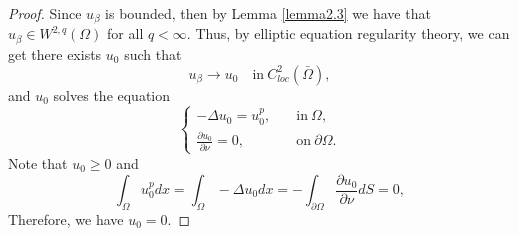 \documentclass[12pt,reqno]{amsart}
\numberwithin{equation}{section}
\theoremstyle{definition}
\begin{document}
\begin{proof}
Since $u_\beta$ is bounded, then by Lemma \ref{lemma2.3} we have that $u_\beta\in W^{2,q}(\Omega)$ for all $q<\infty$. Thus, by elliptic equation regularity theory, we can get there exists $u_0$ such that 
$$
u_\beta\to u_0 \quad \text{in}\ C^2_{loc}(\bar{\Omega}),
$$
and $u_0$ solves the equation 
\begin{equation}
\begin{cases}
-\Delta u_0=u_0^p,\quad  &\text{in}\ \Omega,\\
\frac{\partial u_0}{\partial \nu}=0, &\text{on}\ \partial\Omega.
\end{cases}
\end{equation}
Note that $u_0\ge 0$ and 
$$
\int_{\Omega}u_0^pdx=\int_{\Omega}-\Delta u_0dx=-\int_{\partial\Omega}\frac{\partial u_0}{\partial \nu}dS=0,
$$
Therefore, we have $u_0=0$.


\end{proof}
\end{document}
